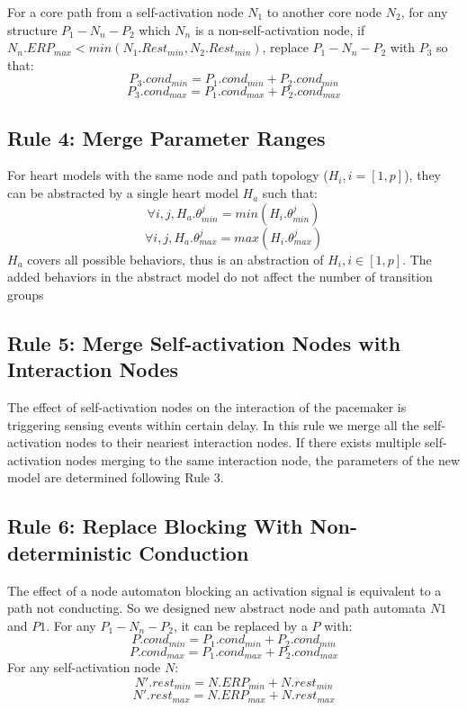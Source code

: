 For a core path from a self-activation node $N_1$ to another core node $N_2$, for any structure $P_1-N_n-P_2$ which $N_n$ is a non-self-activation node, if $N_n.ERP_{max}<min(N_1.Rest_{min},N_2.Rest_{min})$, replace $P_1-N_n-P_2$ with $P_3$ so that:
$$P_3.cond_{min}=P_1.cond_{min}+P_2.cond_{min}$$
$$P_3.cond_{max}=P_1.cond_{max}+P_2.cond_{max}$$
\subsection{Rule 4: Merge Parameter Ranges}
For heart models with the same node and path topology ($H_i,i=[1,p]$), they can be abstracted by a single heart model $H_a$ such that:
$$\forall i,j,H_a.\theta^j_{min}=min(H_i.\theta^j_{min})$$ 
$$\forall i,j,H_a.\theta^j_{max}=max(H_i.\theta^j_{max})$$ 
$H_a$ covers all possible behaviors, thus is an abstraction of $H_i, i\in [1,p]$. The added behaviors in the abstract model do not affect the number of transition groups
%
%
%

\subsection{Rule 5: Merge Self-activation Nodes with Interaction Nodes}
The effect of self-activation nodes on the interaction of the pacemaker is triggering sensing events within certain delay. In this rule we merge all the self-activation nodes to their neariest interaction nodes. If there exists multiple self-activation nodes merging to the same interaction node, the parameters of the new model are determined following Rule 3.

\subsection{Rule 6: Replace Blocking With Non-deterministic Conduction}
The effect of a node automaton blocking an activation signal is equivalent to a path not conducting. So we designed new abstract node and path automata $N1$ and $P1$. For any $P_1-N_n-P_2$, it can be replaced by a $P$ with:
$$P.cond_{min}=P_1.cond_{min}+P_2.cond_{min}$$
$$P.cond_{max}=P_1.cond_{max}+P_2.cond_{max}$$
For any self-activation node $N$:
$$N'.rest_{min}=N.ERP_{min}+N.rest_{min}$$
$$N'.rest_{max}=N.ERP_{max}+N.rest_{max}$$


